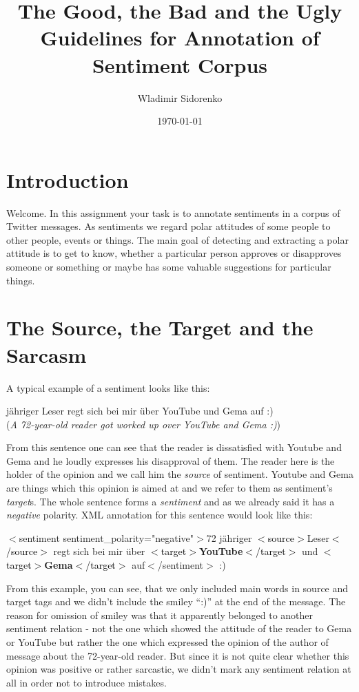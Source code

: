 \documentclass[11pt,a4paper]{article}
\author{Wladimir Sidorenko}
\date{\today}
\title{The Good, the Bad and the Ugly\\
  Guidelines for Annotation of Sentiment Corpus}
\newenvironment{example}{\begin{center}\begin{exe}\ex}{\end{exe}\end{center}}
\newcommand{\xmltag}[1]{\textcolor{black}{{\small$<$#1$>$}}}
\newcommand{\sentiment}[2][negative]{$<$sentiment
  sentiment\_polarity="#1"$>$\textcolor{dodgerblue4}{#2}$<$/sentiment$>$}
\newcommand{\source}[1]{\xmltag{source}\textcolor{orange3}{#1}\xmltag{/source}}
\newcommand{\target}[1]{\xmltag{target}\textbf{#1}\xmltag{/target}}
\begin{document}
\maketitle{}
\section{Introduction}
Welcome. In this assignment your task is to annotate sentiments in a
corpus of Twitter messages.  As sentiments we regard polar attitudes
of some people to other people, events or things. The main goal of
detecting and extracting a polar attitude is to get to know, whether a
particular person approves or disapproves someone or something or
maybe has some valuable suggestions for particular things.

\section{The Source, the Target and the Sarcasm}
A typical example of a sentiment looks like this:
\begin{example}
  72 j\"ahriger Leser regt sich bei mir \"uber YouTube und Gema auf :)\\
  (\textit{A 72-year-old reader got worked up over YouTube and Gema
    :)})\label{ex1}
\end{example}
From this sentence one can see that the reader is dissatisfied with
Youtube and Gema and he loudly expresses his disapproval of them. The
reader here is the holder of the opinion and we call him the
\textit{source} of sentiment. Youtube and Gema are things which this
opinion is aimed at and we refer to them as sentiment's
\textit{target}s. The whole sentence forms a \textit{sentiment} and as
we already said it has a \textit{negative} polarity. XML annotation
for this sentence would look like this:
\begin{example}
  \sentiment{72 j\"ahriger \source{Leser}
    regt sich bei mir \"uber \target{YouTube} und \target{Gema} auf} :)\\
\end{example}
From this example, you can see, that we only included main words in
source and target tags and we didn't include the smiley ``:)'' at the
end of the message. The reason for omission of smiley was that it
apparently belonged to another sentiment relation - not the one which
showed the attitude of the reader to Gema or YouTube but rather the
one which expressed the opinion of the author of message about the
72-year-old reader. But since it is not quite clear whether this
opinion was positive or rather sarcastic, we didn't mark any sentiment
relation at all in order not to introduce mistakes.
\end{document}
